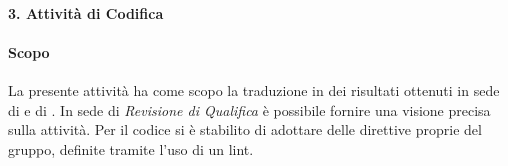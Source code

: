 		
		\paragraph*{3. Attività di Codifica}

                \paragraph*{Scopo}
                La presente attivit\`a ha come scopo la traduzione in  dei risultati ottenuti in sede
                di  e di .
                In sede di \textit{Revisione di Qualifica} \`e possibile fornire una visione precisa sulla attivit\`a.
                Per il codice  si \`e stabilito di adottare delle direttive proprie del gruppo, definite tramite l'uso di un lint.
